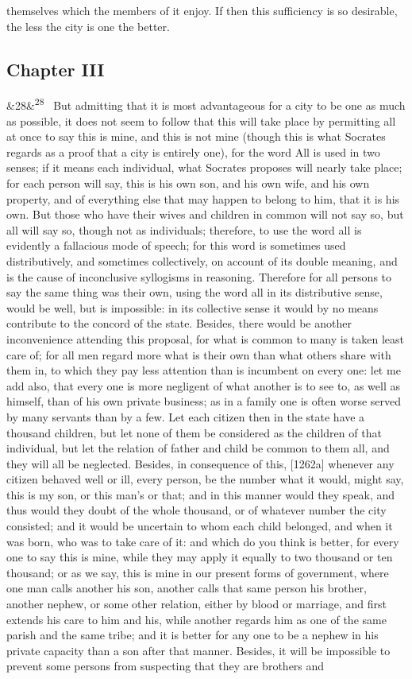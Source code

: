 \documentclass[12pt]{article}
\newcommand{\para}[1][]{\par\noindent\ifx&#1&\else\textsuperscript{\footnotesize #1}~\fi}
\begin{document}
themselves which the members of it enjoy. If then this sufficiency is so desirable, the less the city is one the better.

\subsection*{Chapter III}

\para[28] But admitting that it is most advantageous for a city to be one as much as possible, it does not seem to follow that this will take place by permitting all at once to say this is mine, and this is not mine (though this is what Socrates regards as a proof that a city is entirely one), for the word All is used in two senses; if it means each individual, what Socrates proposes will nearly take place; for each person will say, this is his own son, and his own wife, and his own property, and of everything else that may happen to belong to him, that it is his own. But those who have their wives and children in common will not say so, but all will say so, though not as individuals; therefore, to use the word all is evidently a fallacious mode of speech; for this word is sometimes used distributively, and sometimes collectively, on account of its double meaning, and is the cause of inconclusive syllogisms in reasoning. Therefore for all persons to say the same thing was their own, using the word all in its distributive sense, would be well, but is impossible: in its collective sense it would by no means contribute to the concord of the state. Besides, there would be another inconvenience attending this proposal, for what is common to many is taken least care of; for all men regard more what is their own than what others share with them in, to which they pay less attention than is incumbent on every one: let me add also, that every one is more negligent of what another is to see to, as well as himself, than of his own private business; as in a family one is often worse served by many servants than by a few. Let each citizen then in the state have a thousand children, but let none of them be considered as the children of that individual, but let the relation of father and child be common to them all, and they will all be neglected. Besides, in consequence of this, [1262a] whenever any citizen behaved well or ill, every person, be the number what it would, might say, this is my son, or this man's or that; and in this manner would they speak, and thus would they doubt of the whole thousand, or of whatever number the city consisted; and it would be uncertain to whom each child belonged, and when it was born, who was to take care of it: and which do you think is better, for every one to say this is mine, while they may apply it equally to two thousand or ten thousand; or as we say, this is mine in our present forms of government, where one man calls another his son, another calls that same person his brother, another nephew, or some other relation, either by blood or marriage, and first extends his care to him and his, while another regards him as one of the same parish and the same tribe; and it is better for any one to be a nephew in his private capacity than a son after that manner. Besides, it will be impossible to prevent some persons from suspecting that they are brothers and 
\end{document}
